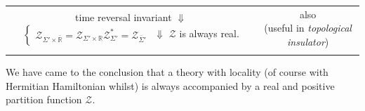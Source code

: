\begin{center}
\begin{tabular}{|c|c|}
        \parbox{6cm}{\centering
            time reversal invariant \\
            $\Downarrow$ \\
            $\begin{cases} 
                \mathcal{Z}_{\Sigma' \times \bar{\mathbb{R}}} = \mathcal{Z}_{\Sigma' \times \mathbb{R}} \\
                \mathcal{Z}_{\Sigma'}^{*} = \mathcal{Z}_{\bar{\Sigma}'}
              \end{cases}
            $\\
            $\Downarrow$ \\
            $\mathcal{Z}$ is always real.
            }&
        \parbox{6cm}{
            \centering also \\ (useful in \emph{topological insulator})
            }
            \\ & \\
            \hline
        
    \end{tabular}
\end{center}
\clearpage
We have came to the conclusion that a theory with locality (of course with Hermitian Hamiltonian whilst) is always accompanied by a real and positive partition function $\mathcal{Z}$.





